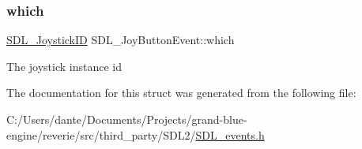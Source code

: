 \subsubsection{\texorpdfstring{which}{which}}
{\footnotesize\ttfamily \mbox{\hyperlink{_s_d_l__joystick_8h_a3c3d32500cb08f76ee8077983912c0bd}{S\+D\+L\+\_\+\+Joystick\+ID}} S\+D\+L\+\_\+\+Joy\+Button\+Event\+::which}

The joystick instance id 

The documentation for this struct was generated from the following file\+:\begin{DoxyCompactItemize}
\item 
C\+:/\+Users/dante/\+Documents/\+Projects/grand-\/blue-\/engine/reverie/src/third\+\_\+party/\+S\+D\+L2/\mbox{\hyperlink{_s_d_l__events_8h}{S\+D\+L\+\_\+events.\+h}}\end{DoxyCompactItemize}

